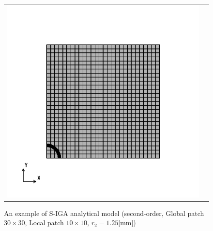 \begin{figure}[hbtp]
  \begin{tabular}{cc}
    \begin{minipage}[t]{0.45\hsize}
      \centering
      \includegraphics[keepaspectratio, scale=0.35]
      {fig/result_data_etc/s-iga04/model/1.25.png}
      \caption{An example of S-IGA analytical model (second-order, Global patch $30\times 30$, Local patch $10\times 10$, $r_2 = 1.25$[mm])}
      \label{fig:s-iga04 model 1.25}
    \end{minipage} &
    \begin{minipage}[t]{0.45\hsize}
      \centering
      \includegraphics[keepaspectratio, scale=0.35]

\end{minipage}
\end{tabular}
\end{figure}
